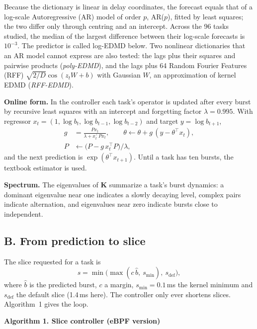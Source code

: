 \documentclass{article}
\newcommand{\K}{\mathbf{K}}
\begin{document}
Because the dictionary is linear in delay coordinates, the forecast equals that of a log-scale Autoregressive (AR) model of order $p$, AR($p$), fitted by least squares; the two differ only through centring and an intercept. Across the 96 tasks studied, the median of the largest difference between their log-scale forecasts is $10^{-3}$. The predictor is called log-EDMD below. Two nonlinear dictionaries that an AR model cannot express are also tested: the lags plus their squares and pairwise products (\emph{poly-EDMD}), and the lags plus 64 Random Fourier Features (RFF) $\sqrt{2/D}\cos(z_tW+b)$ with Gaussian $W$, an approximation of kernel EDMD (\emph{RFF-EDMD}).

\textbf{Online form.} In the controller each task's operator is updated after every burst by recursive least squares with an intercept and forgetting factor $\lambda=0.995$. With regressor $x_t=(1,\log b_t,\log b_{t-1},\log b_{t-2})$ and target $y=\log b_{t+1}$,
\begin{align}
g&=\frac{P x_t}{\lambda+x_t^\top Px_t}, \qquad \theta \leftarrow \theta+g\,(y-\theta^\top x_t),\\
P&\leftarrow \big(P-g\,x_t^\top P\big)/\lambda ,
\end{align}
and the next prediction is $\exp(\theta^\top x_{t+1})$. Until a task has ten bursts, the textbook estimator is used.

\textbf{Spectrum.} The eigenvalues of $\K$ summarize a task's burst dynamics: a dominant eigenvalue near one indicates a slowly decaying level, complex pairs indicate alternation, and eigenvalues near zero indicate bursts close to independent.

\subsection*{B. From prediction to slice}
The slice requested for a task is
\begin{equation}
s=\min\big(\max(c\,\hat b,\ s_{\min}),\ s_{\text{def}}\big),
\end{equation}
where $\hat b$ is the predicted burst, $c$ a margin, $s_{\min}=0.1$\,ms the kernel minimum and $s_{\text{def}}$ the default slice (1.4\,ms here). The controller only ever shortens slices. Algorithm~1 gives the loop.



\textbf{Algorithm 1. Slice controller (eBPF version)}
\end{document}
